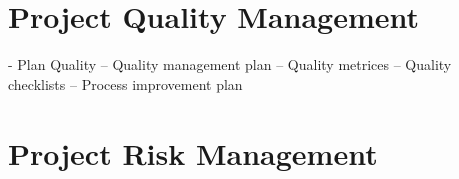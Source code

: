 \documentclass{article}
\begin{document}


\section{Project Quality Management}

- Plan Quality
-- Quality management plan
-- Quality metrices
-- Quality checklists
-- Process improvement plan





\section{Project Risk Management}









\end{document}

